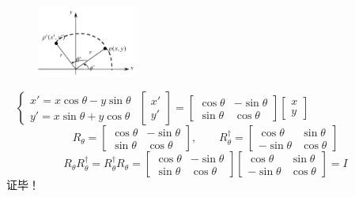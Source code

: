 \begin{frame}     
    \例[1. 试证明二维平面矢量绕原点的旋转变换是幺正变换]{}
    \begin{figure} %
        \includegraphics[width=0.29\textwidth]{figs/transf1.png}   
    \end{figure}
    \证~
    $\left\{\begin{matrix}
        x'=x\cos\theta -y\sin\theta\\
        y'=x\sin\theta+y\cos\theta
    \end{matrix}\right.$ \quad
    $\begin{bmatrix}
        x' \\
        y'
    \end{bmatrix}
    =
    \begin{bmatrix}
        \cos\theta & -\sin\theta\\
        \sin\theta & \cos\theta
    \end{bmatrix}
    \begin{bmatrix}
        x \\
        y
    \end{bmatrix}$\\
    $$ R_\theta=
    \begin{bmatrix}
        \cos\theta &-\sin\theta\\
        \sin\theta &\cos\theta
    \end{bmatrix} ,\qquad
    R_\theta ^{\dagger}=
    \begin{bmatrix}
        \cos\theta &\sin\theta\\
        -\sin\theta &\cos\theta
    \end{bmatrix} $$
    $$ R_\theta  R_\theta ^{\dagger} = R_\theta ^{\dagger} R_\theta=  
    \begin{bmatrix}
        \cos\theta &-\sin\theta\\
        \sin\theta &\cos\theta
    \end{bmatrix}
    \begin{bmatrix}
        \cos\theta &\sin\theta\\
        -\sin\theta &\cos\theta
    \end{bmatrix}
    =I
    $$
    证毕！
\end{frame}

